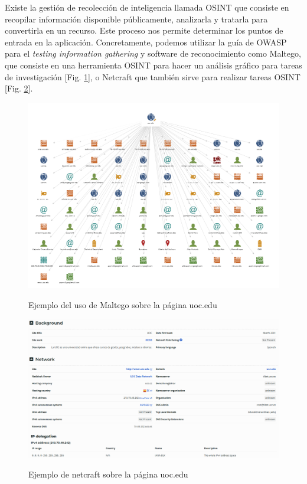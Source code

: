 \documentclass[a4paper,oneside]{article}
\begin{document}
Existe la gestión de recolección de inteligencia llamada OSINT que consiste en recopilar información disponible públicamente, analizarla y tratarla para convertirla en un recurso. Este proceso nos permite determinar los puntos de entrada en la aplicación.
Concretamente, podemos utilizar la guía de OWASP para el \textit{testing information gathering} \cite{tig} y  software de reconocimiento como Maltego, que consiste en una herramienta OSINT para hacer un análisis gráfico para tareas de investigación \cite{maltego} [Fig. \ref{fig:maltego}], o Netcraft que también sirve para realizar tareas OSINT \cite{netcraft} [Fig. \ref{fig:netcraft}].

\begin{figure}[h!]
  \centering
  \includegraphics[scale=0.4]{images/maltego.png}\\
  \caption{Ejemplo del uso de Maltego sobre la página uoc.edu}
  \label{fig:maltego}
\end{figure}

\begin{figure}[h!]
  \centering
  \includegraphics[scale=0.3]{images/netcraft.png}\\
  \caption{Ejemplo de netcraft sobre la página uoc.edu}
  \label{fig:netcraft}
\end{figure}
\end{document}
